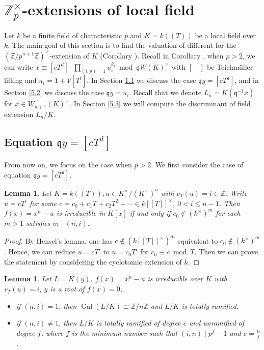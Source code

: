 \documentclass{proc-l}
\newtheorem{lemma}[theorem]{Lemma}
\theoremstyle{definition}
\theoremstyle{remark}
\numberwithin{equation}{section}
\DeclareMathOperator{\Gal}{Gal}
\begin{document}
{\section{$\mathbb Z_p^\times$-extensions of local field}\label{sec4}

Let $k$ be a finite field of characteristic $p$ and $K=k(\!(T)\!)$ be a local field over $k$. The main goal of this section is to find the valuation of different for the $(\mathbb Z/p^{n+1}\mathbb Z)^\times$-extension of $K$ (Corollary \boxed{\ref{4.13}}).  Recall in Corollary \boxed{\ref{3.8}}, when $p>2$, we can write $x\equiv [cT^d]\cdot\prod_{(i,p)=1}u_i^{k_i}\bmod\mathfrak qW(K)^\times$ with $[\quad]$ be Teichm\"uller lifting and $u_i=1+V[T^i]$.  In Section \ref{sec5.1} we discuss the case $\mathfrak qy=[cT^d]$, and in Section \ref{5.2} we discuss the case $\mathfrak qy=u_i$. Recall that we denote $L_n=K(\mathfrak q^{-1}x)$ for $x\in W_{n+1}(K)^\times$.  In Section \ref{5.3} we will compute the discriminant of field extension $L_{n}/K$. %
\subsection{Equation $\mathfrak qy=[cT^d]$}\label{sec5.1}
From now on, we focus on the case when $p>2$. We first consider the case of equation $\mathfrak qy=[cT^d]$. 
\begin{lemma}\label{4.2}
Let $ K=k(\!(T)\!),u\in K^\times/(K^\times)^n$ with $v_T(u)=i\in\mathbb Z.$ Write $u=cT^i$ for some $c=c_0+c_1T+c_2T^2+\cdots\in k[\![T]\!]^\times$, $0< i\leq n-1$. Then $f(x)=x^n-u$ is irreducible in $K[x]$ if and only if $c_0\notin(k^\times)^m$ for each $m>1$ satisfies $m\mid(n,i)$.
\end{lemma}
\begin{proof}
By Hensel's lemma, one has $c\notin(k[\![T]\!]^\times)^m$ equivalent to $c_0\notin(k^\times)^m$. Hence, we can reduce $u=cT^i$ to $u=c_0T^i$ for $c_0\equiv c\bmod T$. Then we can prove the statement by considering the cyclotomic extension of $k$.
\end{proof}

\begin{lemma}\label{4.3}
Let $L=K(y)$, $f(x)=x^n-u$ is irreducible over $K$ with $v_T(u)=i$, $y$ is a root of $f(x)=0$, 
\begin{itemize}
    \item if $(n,i)=1$, then $\Gal(L/K)\cong\mathbb Z/n\mathbb Z$ and $L/K$ is totally ramified.
     \item if $(n,i)\neq1$, then $L/K$ is totally ramified of degree $e$ and unramified of degree $f$, where $f$ is the minimum number such that $(i,n)\mid p^f-1$ and $e=\frac{n}{f}$.
     \end{itemize}
\end{lemma}

}
\end{document}
